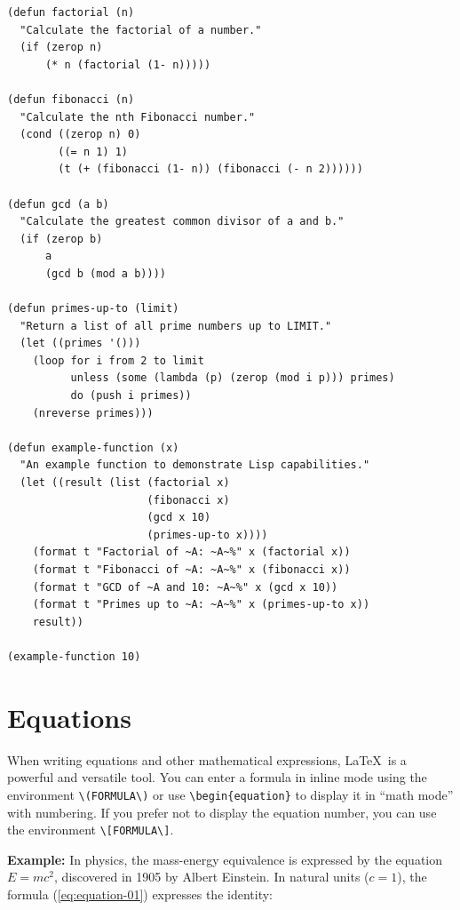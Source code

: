 \begin{longlisting}
    \caption{A sample of functions in Lisp.}
    \label{listing:lisp-code}
    \begin{verbatim}
(defun factorial (n)
  "Calculate the factorial of a number."
  (if (zerop n)
      (* n (factorial (1- n)))))

(defun fibonacci (n)
  "Calculate the nth Fibonacci number."
  (cond ((zerop n) 0)
        ((= n 1) 1)
        (t (+ (fibonacci (1- n)) (fibonacci (- n 2))))))

(defun gcd (a b)
  "Calculate the greatest common divisor of a and b."
  (if (zerop b)
      a
      (gcd b (mod a b))))

(defun primes-up-to (limit)
  "Return a list of all prime numbers up to LIMIT."
  (let ((primes '()))
    (loop for i from 2 to limit
          unless (some (lambda (p) (zerop (mod i p))) primes)
          do (push i primes))
    (nreverse primes)))

(defun example-function (x)
  "An example function to demonstrate Lisp capabilities."
  (let ((result (list (factorial x)
                      (fibonacci x)
                      (gcd x 10)
                      (primes-up-to x))))
    (format t "Factorial of ~A: ~A~%" x (factorial x))
    (format t "Fibonacci of ~A: ~A~%" x (fibonacci x))
    (format t "GCD of ~A and 10: ~A~%" x (gcd x 10))
    (format t "Primes up to ~A: ~A~%" x (primes-up-to x))
    result))

(example-function 10)
\end{verbatim}
\end{longlisting}

\section{Equations}
When writing equations and other mathematical expressions, \LaTeX~is a powerful and versatile tool. You can enter a formula in inline mode using the environment \verb|\(FORMULA\)| or use \verb|\begin{equation}| to display it in ``math mode'' with numbering. If you prefer not to display the equation number, you can use the environment \verb|\[FORMULA\]|.

\vspace{.875em}
\textbf{Example:} In physics, the mass-energy equivalence is expressed by the equation \(E=mc^2\), discovered in 1905 by Albert Einstein. In natural units (\(c = 1\)), the formula (\ref{eq:equation-01}) expresses the identity:

